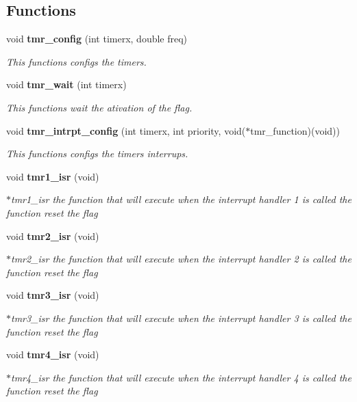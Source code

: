 \subsection*{Functions}
\begin{DoxyCompactItemize}
\item 
void \textbf{ tmr\+\_\+config} (int timerx, double freq)
\begin{DoxyCompactList}\small\item\em This functions configs the timer\textquotesingle{}s. \end{DoxyCompactList}\item 
void \textbf{ tmr\+\_\+wait} (int timerx)
\begin{DoxyCompactList}\small\item\em This functions wait the ativation of the flag. \end{DoxyCompactList}\item 
void \textbf{ tmr\+\_\+intrpt\+\_\+config} (int timerx, int priority, void($\ast$tmr\+\_\+function)(void))
\begin{DoxyCompactList}\small\item\em This functions configs the timer\textquotesingle{}s interrups. \end{DoxyCompactList}\item 
void \textbf{ tmr1\+\_\+isr} (void)
\begin{DoxyCompactList}\small\item\em $\ast$tmr1\+\_\+isr the function that will execute when the interrupt handler 1 is called the function reset the flag \end{DoxyCompactList}\item 
void \textbf{ tmr2\+\_\+isr} (void)
\begin{DoxyCompactList}\small\item\em $\ast$tmr2\+\_\+isr the function that will execute when the interrupt handler 2 is called the function reset the flag \end{DoxyCompactList}\item 
void \textbf{ tmr3\+\_\+isr} (void)
\begin{DoxyCompactList}\small\item\em $\ast$tmr3\+\_\+isr the function that will execute when the interrupt handler 3 is called the function reset the flag \end{DoxyCompactList}\item 
void \textbf{ tmr4\+\_\+isr} (void)
\begin{DoxyCompactList}\small\item\em $\ast$tmr4\+\_\+isr the function that will execute when the interrupt handler 4 is called the function reset the flag \end{DoxyCompactList}\item 

\end{DoxyCompactItemize}
